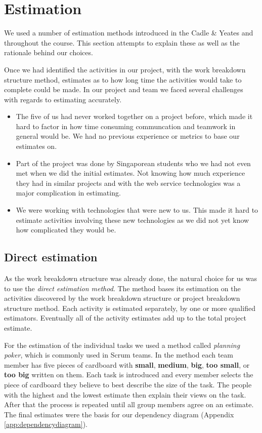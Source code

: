 \section{Estimation}
\label{sec:EmpiriEstimation}

We used a number of estimation methods introduced in the Cadle \& Yeates\cite[ch.~9]{caye} and throughout the
course. This section attempts to explain these as well as the rationale behind our choices.

Once we had identified the activities in our project, with the work breakdown structure method,
estimates as to how long time the activities would take to complete could be made. In our project
and team we faced several challenges with regards to estimating accurately.

\begin{itemize}
\item The five of us had never worked together on a project before, which made it hard to factor
    in how time consuming communcation and teamwork in general would be. We had no previous experience
    or metrics to base our estimates on.
    
\item Part of the project was done by Singaporean students who we had not even met when we did the
    initial estimates. Not knowing how much experience they had in similar projects and with the web
    service technologies was a major complication in estimating.
    
\item We were working with technologies that were new to us. This made it hard to estimate activities
    involving these new technologies as we did not yet know how complicated they would be.
\end{itemize}

\subsection{Direct estimation}

As the work breakdown structure was already done, the natural choice for us was to use the \emph{direct
estimation method}\cite{caye}. The method bases its estimation on the activities discovered by the work
breakdown structure or project breakdown structure method. Each activity is  estimated separately, by
one or more qualified estimators. Eventually all of the activity estimates add up to the total project
estimate. 

For the estimation of the individual tasks we used a method called \emph{planning poker}, which is commonly
used in Scrum teams. In the method each team member has five pieces of cardboard with \textbf{small},
\textbf{medium}, \textbf{big}, \textbf{too small}, or \textbf{too big} written on them. Each task is
introduced and every member selects the piece of cardboard they believe to best describe the size of the task.
The people with the highest and the lowest estimate then explain their views on the task. After that the
process is repeated until all group members agree on an estimate. The final estimates were the basis for our
dependency diagram (Appendix \ref{app:dependencydiagram}).

